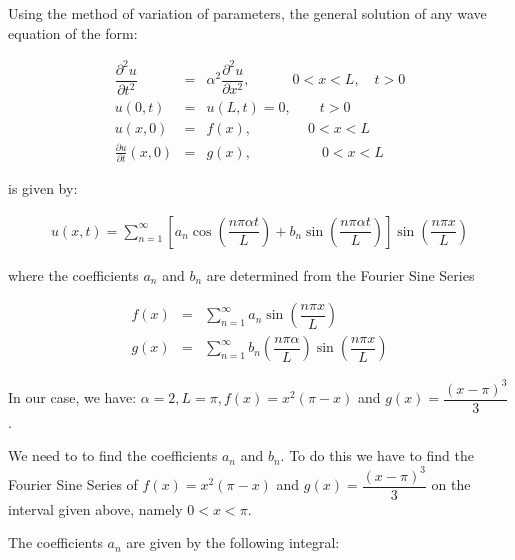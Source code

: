 \documentclass[11pt]{article}
\begin{document}
\begin{solution}
 Using the method of variation of parameters, the general solution of any wave equation of the form:

\begin{eqnarray*}
\dfrac{ \partial^2 u }{\partial t^2} & = & \alpha^2 \dfrac{ \partial^2 u }{\partial x^2} , \quad \quad  \quad 0<x<L, \quad t>0 \\
u(0,t) & = & u(L,t) =0,  \quad \quad t>0 \\
u(x,0) & = & f(x), \quad \quad \quad \quad  0<x<L \\
\frac{ \partial u }{\partial t}(x,0) & = & g(x), \quad \quad \quad \quad \quad 0<x<L
\end{eqnarray*}

is given by:

\begin{eqnarray*}
u(x,t) = \sum_{n=1}^{\infty} \left[ a_{n} \cos \left( \dfrac{n\pi \alpha t}{L} \right) + b_{n} \sin \left( \dfrac{n\pi \alpha t}{L} \right) \right] \sin \left( \dfrac{n\pi x}{L} \right)
\end{eqnarray*}

where the coefficients $a_{n}$ and $b_{n}$ are determined from the Fourier Sine Series

\begin{eqnarray}
f(x) & = & \sum_{n=1}^{\infty} a_{n} \sin \left( \dfrac{n\pi x}{L} \right) \nonumber \\
g(x) & = & \sum_{n=1}^{\infty} b_{n} \left( \dfrac{n\pi \alpha}{L} \right) \sin \left( \dfrac{n\pi x}{L} \right) \label{formula: b_n coefficients}
\end{eqnarray}

In our case, we have: $\alpha =2, L = \pi, f(x) = x^2(\pi-x)$ and $g(x) = \dfrac{(x-\pi)^3}{3}$.

We need to to find the coefficients $a_{n}$ and $b_{n}$. To do this we have to find the Fourier Sine Series of $f(x)= x^2(\pi-x)$  and $g(x)= \dfrac{(x-\pi)^3}{3}$ on the interval given above, namely $0<x<\pi$.

The coefficients $a_{n}$ are given by the following integral:


\end{solution}
\end{document}
